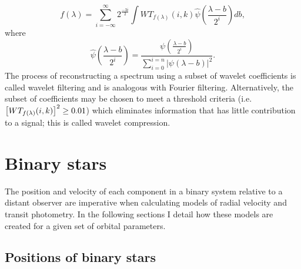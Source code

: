 %
\begin{equation}\label{IDWT}
f(\lambda) = \sum_{i=-\infty }^{\infty} 2^{\frac{-3i}{2}} \int WT_{f(\lambda)}(i,k)\hat{\psi} \left(\frac{\lambda - b}{2^i} \right)db
,\end{equation}
%
where
%
\begin{equation}
\hat{\psi} \left(\frac{\lambda - b}{2^i} \right) = \frac{\psi \left(\frac{\lambda - b}{2^i} \right)}{\sum_{i=0}^{i=n} \left| \psi \left(\lambda - b \right) \right|^2 }
.\end{equation}
%
The process of reconstructing a spectrum using a subset of wavelet coefficients is called wavelet filtering and is analogous with Fourier filtering. Alternatively, the subset of coefficients may be chosen to meet a threshold criteria (i.e. $\left[ WT_{f(\lambda)}(i,k) \right]^2  \geq \rm 0.01$) which eliminates information that has little contribution to a signal; this is called wavelet compression.
\fi 

















\section{Binary stars}\label{theory:binary_stars}

The position and velocity of each component in a binary system relative to a distant observer are imperative when calculating models of radial velocity and transit photometry. In the following sections I detail how these models are created for a given set of orbital parameters.

\subsection{Positions of binary stars}

